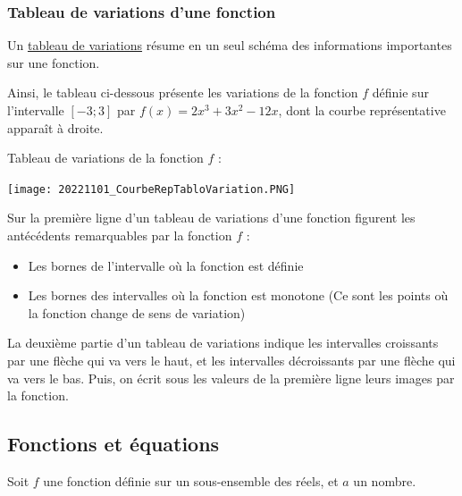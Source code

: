 \documentclass[10pt,a4paper]{book}
\begin{document}
\subsubsection{Tableau de variations d'une fonction}

Un \underline{tableau de variations} résume en un seul schéma des informations importantes sur une fonction.

\begin{minipage}{0.7\textwidth}
    Ainsi, le tableau ci-dessous présente les variations de la fonction $f$ définie sur l'intervalle $[-3;3]$ par $f(x)=2x^3+3x^2-12x$, dont la courbe représentative apparaît à droite.
    \newline
    
    \vspace{1 cm}
    Tableau de variations de la fonction $f$ : \newline
    
\end{minipage}
\begin{minipage}{0.25\textwidth}
    \centering
    \texttt{[image: 20221101\_CourbeRepTabloVariation.PNG]} 
\end{minipage}

Sur la première ligne d'un tableau de variations d'une fonction figurent les antécédents remarquables par la fonction $f$ :\begin{itemize}
    \item Les bornes de l'intervalle où la fonction est définie
    \item Les bornes des intervalles où la fonction est monotone (Ce sont les points où la fonction change de sens de variation)
\end{itemize}

La deuxième partie d'un tableau de variations indique les intervalles croissants par une flèche qui va vers le haut, et les intervalles décroissants par une flèche qui va vers le bas. Puis, on écrit sous les valeurs de la première ligne leurs images par la fonction.


\subsection{Fonctions et équations}

Soit $f$ une fonction définie sur un sous-ensemble des réels, et $a$ un nombre.
\end{document}
